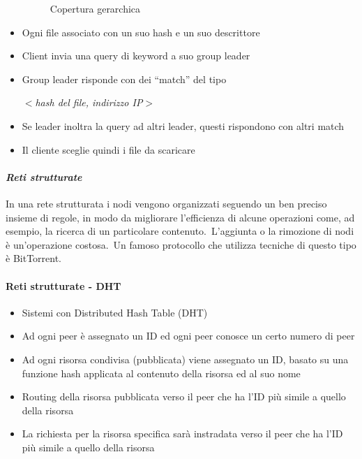 \begin{itemize}
\begin{figure}[H]
              \caption*{Copertura gerarchica}
          \end{figure}
    \item Ogni file associato con un suo hash e un suo descrittore
    \item Client invia una query di keyword a suo group leader
    \item Group leader risponde con dei ``match'' del tipo
          \begin{center}
              $<$\emph{hash del file, indirizzo IP}$>$
          \end{center}
    \item Se leader inoltra la query ad altri leader, questi rispondono con altri match
    \item Il cliente sceglie quindi i file da scaricare
\end{itemize}

\paragraph{\emph{Reti strutturate}}

In una rete strutturata i nodi vengono organizzati seguendo un ben preciso insieme di regole, in modo da migliorare l'efficienza di alcune operazioni come, ad esempio, la ricerca di un particolare contenuto.\
L'aggiunta o la rimozione di nodi è un'operazione costosa.\
Un famoso protocollo che utilizza tecniche di questo tipo è BitTorrent.

\paragraph{Reti strutturate - DHT}

\begin{itemize}
    \item Sistemi con Distributed Hash Table (DHT)
    \item Ad ogni peer è assegnato un ID ed ogni peer conosce un certo numero di peer
    \item Ad ogni risorsa condivisa (pubblicata) viene assegnato un ID, basato su una funzione hash applicata al contenuto della risorsa ed al suo nome
    \item Routing della risorsa pubblicata verso il peer che ha l’ID più simile a quello della risorsa
    \item La richiesta per la risorsa specifica sarà instradata verso il peer che ha l’ID più simile a quello della risorsa
\end{itemize}

